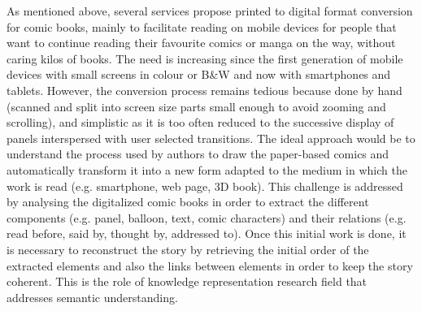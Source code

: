 	
	
	


% 
% 

As mentioned above, several services propose printed to digital format conversion for comic books, mainly to facilitate reading on mobile devices for people that want to continue reading their favourite comics or manga on the way, without caring kilos of books.
The need is increasing since the first generation of mobile devices with small screens in colour or B\&W and now with smartphones and tablets.
However, the conversion process remains tedious because done by hand (scanned and split into screen size parts small enough to avoid zooming and scrolling), and simplistic as it is too often reduced to the successive display of panels interspersed with user selected transitions.
The ideal approach would be to understand the process used by authors to draw the paper-based comics and automatically transform it into a new form adapted to the medium in which the work is read (e.g. smartphone, web page, 3D book). 
This challenge is addressed by analysing the digitalized comic books in order to extract the different components (e.g. panel, balloon, text, comic characters) and their relations (e.g. read before, said by, thought by, addressed to).
Once this initial work is done, it is necessary to reconstruct the story by retrieving the initial order of the extracted elements and also the links between elements in order to keep the story coherent.
This is the role of knowledge representation research field that addresses semantic understanding.%


